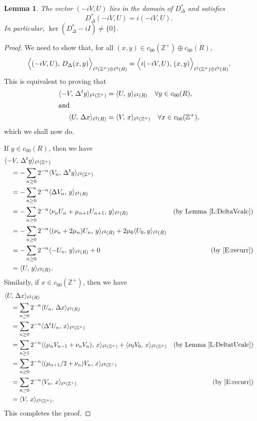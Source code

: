 \documentclass[11pt,reqno]{amsart}
\theoremstyle{plain}
\newtheorem{lemma}[theorem]{Lemma}
\theoremstyle{definition}
\theoremstyle{remark}
\newcommand{\ZZ}{\mathbb{Z}}
\begin{document}
\begin{lemma}\label{L:eigenvector}
The vector $(-iV,U)$ lies in the domain of $D_\Delta^*$ and satisfies
\[
D_\Delta^*(-iV,U)=i(-iV,U).
\]
In particular, $\ker(D_\Delta^*-iI)\ne\{0\}$.
\end{lemma}

\begin{proof}
We need to show that, for all $(x,y)\in c_{00}(\ZZ^+)\oplus c_{00}(R)$,
\[
\Bigl\langle (-iV,U),\,D_\Delta(x,y)\Bigr\rangle_{\ell^2(\ZZ^+)\oplus\ell^2(R)}=
\Bigl\langle i(-iV,U),\,(x,y)\Bigr\rangle_{\ell^2(\ZZ^+)\oplus\ell^2(R)}.
\]
This is equivalent to proving that
\begin{align*}
\langle -V,\,\Delta^ty\rangle_{\ell^2(\ZZ^+)}
&=\langle U,\,y\rangle_{\ell^2(R)} 
\quad\forall y\in c_{00}(R),\\
\intertext{and}
\langle U,\,\Delta x\rangle_{\ell^2(R)}
&=\langle V,\,x\rangle_{\ell^2(\ZZ^+)}
\quad\forall x\in c_{00}(\ZZ^+),
\end{align*}
which we shall now do.

If $y\in c_{00}(R)$, then we have
\begin{align*}
&\langle -V,\,\Delta^t y\rangle_{\ell^2(\ZZ^+)}\\
&\quad=-\sum_{n\ge0}2^{-n}\langle V_n,\,\Delta^t y\rangle_{\ell^2(\ZZ^+)}\\
&\quad=-\sum_{n\ge0}2^{-n}\langle \Delta V_n,\, y\rangle_{\ell^2(R)}\\
&\quad=-\sum_{n\ge0}2^{-n}\langle \nu_nU_n+\mu_{n+1}U_{n+1},\, y\rangle_{\ell^2(R)} 
&\text{(by Lemma~\ref{L:DeltaVcalc})}\\
&\quad=-\sum_{n\ge0}2^{-n}\langle (\nu_n+2\mu_n)U_n,\, y\rangle_{\ell^2(R)}+2\mu_0\langle U_0,y\rangle_{\ell^2(R)}\\
&\quad=-\sum_{n\ge0}2^{-n}\langle -U_n,\,y\rangle_{\ell^2(R)}+0 
&\text{(by \eqref{E:recurr})}\\
&\quad=\langle U,\,y\rangle_{\ell^2(R)}.
\end{align*}
Similarly, if $x\in c_{00}(\ZZ^+)$, then we have
\begin{align*}
&\langle U,\,\Delta x\rangle_{\ell^2(R)}\\
&\quad=\sum_{n\ge0}2^{-n}\langle U_n,\,\Delta x\rangle_{\ell^2(R)}\\
&\quad=\sum_{n\ge0}2^{-n}\langle \Delta^t U_n,\, x\rangle_{\ell^2(\ZZ^+)}\\
&\quad=\sum_{n\ge1}2^{-n}\langle (\mu_nV_{n-1}+\nu_{n}V_{n}),\, x\rangle_{\ell^2(\ZZ^+)} +\langle \nu_0V_0,\,x\rangle_{\ell^2(\ZZ^+)}
&\text{(by Lemma~\ref{L:DeltatUcalc})}\\
&\quad=\sum_{n\ge0}2^{-n}\langle(\mu_{n+1}/2+\nu_n)V_n,\, x\rangle_{\ell^2(\ZZ^+)}\\
&\quad=\sum_{n\ge0}2^{-n}\langle V_n,\,x\rangle_{\ell^2(\ZZ^+)}
&\text{(by \eqref{E:recurr})}\\
&\quad=\langle V,\,x\rangle_{\ell^2(\ZZ^+)}.
\end{align*}
This completes the proof.
\end{proof}
\end{document}
